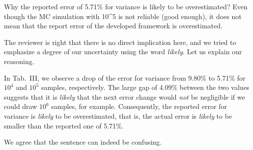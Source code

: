 \begin{reviewer}
Why the reported error of 5.71\% for variance is likely to be overestimated? Even though the MC simulation with 10\^{}5 is not reliable (good enough), it does not mean that the report error of the developed framework is overestimated.
\end{reviewer}
\begin{authors}
The reviewer is right that there is no direct implication here, and we tried to emphasize a degree of our uncertainty using the word \emph{likely}.
Let us explain our reasoning.

In Tab.~III, we observe a drop of the error for variance from 9.80\% to 5.71\% for $10^4$ and $10^5$ samples, respectively.
The large gap of 4.09\% between the two values suggests that it is \emph{likely} that the next error change would \emph{not} be negligible if we could draw $10^6$ samples, for example.
Consequently, the reported error for variance is \emph{likely} to be overestimated, that is, the actual error is \emph{likely} to be smaller than the reported one of 5.71\%.

We agree that the sentence can indeed be confusing.

\begin{actions}
\end{actions}
\end{authors}

